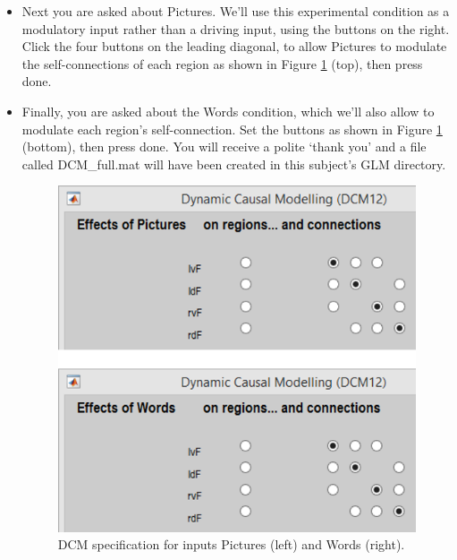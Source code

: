 \documentclass{article}
\begin{document}
\begin{itemize}
\item Next you are asked about Pictures. We'll use this experimental condition as a modulatory input rather than a driving input, using the buttons on the right. Click the four buttons on the leading diagonal, to allow Pictures to modulate the self-connections of each region as shown in Figure \ref{Fig_dcm_spec_Pictures_Words} (top), then press done.

\item Finally, you are asked about the Words condition, which we'll also allow to modulate each region's self-connection. Set the buttons as shown in Figure \ref{Fig_dcm_spec_Pictures_Words} (bottom), then press done. You will receive a polite `thank you' and a file called DCM\_full.mat will have been created in this subject's GLM directory.

\begin{figure}[ht]
\begin{center}
\includegraphics{"Fig_dcm_spec_Pictures_Words"}
\caption{DCM specification for inputs Pictures (left) and Words (right).\label{Fig_dcm_spec_Pictures_Words}}
\end{center}
\end{figure}

\end{itemize}
\end{document}
